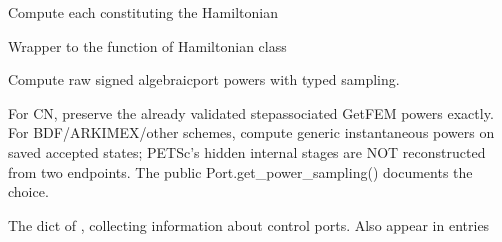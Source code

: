 \documentclass[letterpaper,10pt,english]{sphinxmanual}
\begin{document}
\begin{fulllineitems}
\begin{fulllineitems}
\end{fulllineitems}


\begin{fulllineitems}
\label{\detokenize{scrimp:scrimp.dphs.DPHS.compute_Hamiltonian}}
\pysigstartsignatures
\pysiglinewithargsret
{}
{}
{}
\pysigstopsignatures
\sphinxAtStartPar
Compute each  constituting the Hamiltonian

\sphinxAtStartPar
Wrapper to the function  of Hamiltonian class

\end{fulllineitems}


\begin{fulllineitems}
\label{\detokenize{scrimp:scrimp.dphs.DPHS.compute_powers}}
\pysigstartsignatures
\pysiglinewithargsret
{}
{}
{}
\pysigstopsignatures
\sphinxAtStartPar
Compute raw signed algebraic\sphinxhyphen{}port powers with typed sampling.

\sphinxAtStartPar
For CN, preserve the already validated step\sphinxhyphen{}associated GetFEM
powers exactly. For BDF/ARKIMEX/other schemes, compute generic
instantaneous powers on saved accepted states; PETSc’s hidden
internal stages are NOT reconstructed from two endpoints.
The public Port.get\_power\_sampling() documents the choice.

\end{fulllineitems}


\begin{fulllineitems}
\label{\detokenize{scrimp:scrimp.dphs.DPHS.controls}}
\pysigstartsignatures
\pysigline
{}
\pysigstopsignatures
\sphinxAtStartPar
The dict of , collecting information about control ports. Also appear in  entries

\end{fulllineitems}



\end{fulllineitems}
\end{document}
